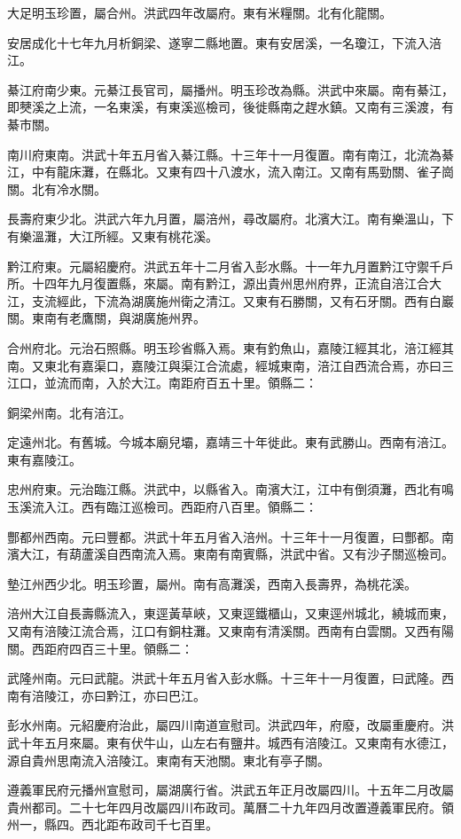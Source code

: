 大足明玉珍置，屬合州。洪武四年改屬府。東有米糧關。北有化龍關。

安居成化十七年九月析銅梁、遂寧二縣地置。東有安居溪，一名瓊江，下流入涪江。

綦江府南少東。元綦江長官司，屬播州。明玉珍改為縣。洪武中來屬。南有綦江，即僰溪之上流，一名東溪，有東溪巡檢司，後徙縣南之趕水鎮。又南有三溪渡，有綦市關。

南川府東南。洪武十年五月省入綦江縣。十三年十一月復置。南有南江，北流為綦江，中有龍床灘，在縣北。又東有四十八渡水，流入南江。又南有馬勁關、雀子崗關。北有冷水關。

長壽府東少北。洪武六年九月置，屬涪州，尋改屬府。北濱大江。南有樂溫山，下有樂溫灘，大江所經。又東有桃花溪。

黔江府東。元屬紹慶府。洪武五年十二月省入彭水縣。十一年九月置黔江守禦千戶所。十四年九月復置縣，來屬。南有黔江，源出貴州思州府界，正流自涪江合大江，支流經此，下流為湖廣施州衛之清江。又東有石勝關，又有石牙關。西有白巖關。東南有老鷹關，與湖廣施州界。

合州府北。元治石照縣。明玉珍省縣入焉。東有釣魚山，嘉陵江經其北，涪江經其南。又東北有嘉渠口，嘉陵江與渠江合流處，經城東南，涪江自西流合焉，亦曰三江口，並流而南，入於大江。南距府百五十里。領縣二：

銅梁州南。北有涪江。

定遠州北。有舊城。今城本廟兒壩，嘉靖三十年徙此。東有武勝山。西南有涪江。東有嘉陵江。

忠州府東。元治臨江縣。洪武中，以縣省入。南濱大江，江中有倒須灘，西北有鳴玉溪流入江。西有臨江巡檢司。西距府八百里。領縣二：

酆都州西南。元曰豐都。洪武十年五月省入涪州。十三年十一月復置，曰酆都。南濱大江，有葫蘆溪自西南流入焉。東南有南賓縣，洪武中省。又有沙子關巡檢司。

墊江州西少北。明玉珍置，屬州。南有高灘溪，西南入長壽界，為桃花溪。

涪州大江自長壽縣流入，東逕黃草峽，又東逕鐵櫃山，又東逕州城北，繞城而東，又南有涪陵江流合焉，江口有銅柱灘。又東南有清溪關。西南有白雲關。又西有陽關。西距府四百三十里。領縣二：

武隆州南。元曰武龍。洪武十年五月省入彭水縣。十三年十一月復置，曰武隆。西南有涪陵江，亦曰黔江，亦曰巴江。

彭水州南。元紹慶府治此，屬四川南道宣慰司。洪武四年，府廢，改屬重慶府。洪武十年五月來屬。東有伏牛山，山左右有鹽井。城西有涪陵江。又東南有水德江，源自貴州思南流入涪陵江。東南有天池關。東北有亭子關。

遵義軍民府元播州宣慰司，屬湖廣行省。洪武五年正月改屬四川。十五年二月改屬貴州都司。二十七年四月改屬四川布政司。萬曆二十九年四月改置遵義軍民府。領州一，縣四。西北距布政司千七百里。

